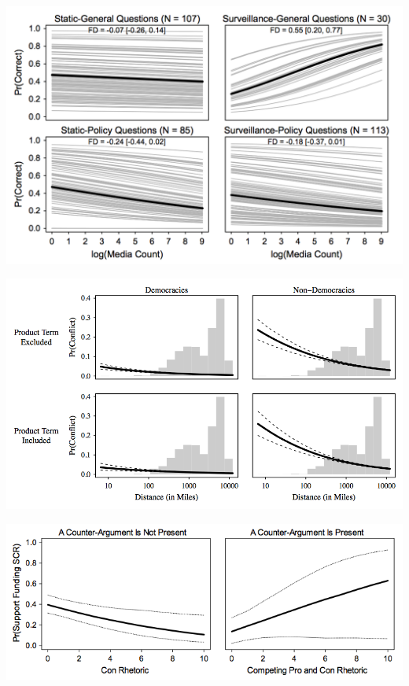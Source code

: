 \documentclass[handout]{beamer}
\begin{document}
\begin{frame}
\hspace*{-10mm}
\includegraphics[width=\paperwidth]{figs/quadrants2.png}
\end{frame}

\begin{frame}
\hspace*{-10mm}
\includegraphics[width=\paperwidth]{figs/compress.png}
\end{frame}

\begin{frame}
\hspace*{-10mm}
\includegraphics[width=\paperwidth]{figs/rhetoric.png}
\end{frame}
\end{document}
